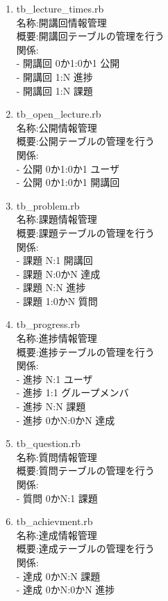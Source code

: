 \begin{enumerate}
\item tb\_lecture\_times.rb\\
名称:開講回情報管理\\
概要:開講回テーブルの管理を行う\\
関係:\\
- 開講回 0か1:0か1 公開\\
- 開講回 1:N 進捗\\
- 開講回 1:N 課題

\item tb\_open\_lecture.rb\\
名称:公開情報管理\\
概要:公開テーブルの管理を行う\\
関係:\\
- 公開 0か1:0か1 ユーザ\\
- 公開 0か1:0か1 開講回

\item tb\_problem.rb\\
名称:課題情報管理\\
概要:課題テーブルの管理を行う\\
関係:\\
- 課題 N:1 開講回\\
- 課題 N:0かN 達成\\
- 課題 N:N 進捗\\
- 課題 1:0かN 質問

\item tb\_progress.rb\\
名称:進捗情報管理\\
概要:進捗テーブルの管理を行う\\
関係:\\
- 進捗 N:1 ユーザ\\
- 進捗 1:1 グループメンバ\\
- 進捗 N:N 課題\\
- 進捗 0かN:0かN 達成

\item tb\_question.rb\\
名称:質問情報管理\\
概要:質問テーブルの管理を行う\\
関係:\\
- 質問 0かN:1 課題

\item tb\_achievment.rb\\
名称:達成情報管理\\
概要:達成テーブルの管理を行う\\
関係:\\
- 達成 0かN:N 課題\\
- 達成 0かN:0かN 進捗

\end{enumerate}
